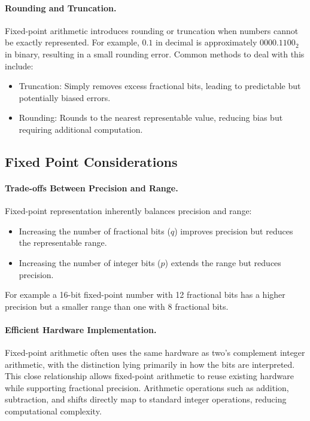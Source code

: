 \paragraph{Rounding and Truncation.}
Fixed-point arithmetic introduces rounding or truncation when numbers cannot be exactly represented. For example, \( 0.1 \) in decimal is approximately \( 0000.1100_2 \) in binary, resulting in a small rounding error. Common methods to deal with this include:
\begin{itemize}
    \item Truncation: Simply removes excess fractional bits, leading to predictable but potentially biased errors.
    \item Rounding: Rounds to the nearest representable value, reducing bias but requiring additional computation.

\end{itemize}

\subsection{Fixed Point Considerations}
\paragraph{Trade-offs Between Precision and Range.}
Fixed-point representation inherently balances precision and range:
\begin{itemize}
    \item Increasing the number of fractional bits (\( q \)) improves precision but reduces the representable range.
    \item Increasing the number of integer bits (\( p \)) extends the range but reduces precision.
\end{itemize}
For example 
a 16-bit fixed-point number with 12 fractional bits has a higher precision but a smaller range than one with 8 fractional bits.

\paragraph{Efficient Hardware Implementation.}
Fixed-point arithmetic often uses the same hardware as two's complement integer arithmetic, with the distinction lying primarily in how the bits are interpreted. This close relationship allows fixed-point arithmetic to reuse existing hardware while supporting fractional precision. Arithmetic operations such as addition, subtraction, and shifts directly map to standard integer operations, reducing computational complexity.

